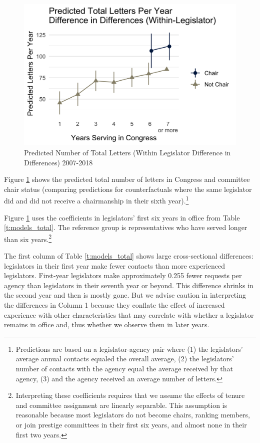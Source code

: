 \begin{figure}[hbt!]
\centering
\caption{Predicted Number of Total Letters (Within Legislator Difference in Differences) 2007-2018} \label{f:m-total-predicted-time}
\includegraphics[width = .8\textwidth]{figs/m-total-predicted-4}
\end{figure}

Figure \ref{f:m-total-predicted-time} shows the predicted total number of letters in Congress and committee chair status (comparing predictions for counterfactuals where the same legislator did and did not receive a chairmanship in their sixth year).\footnote{Predictions are based on a legislator-agency pair where (1) the legislators' average annual contacts equaled the overall average, (2) the legislators' number of contacts with the agency equal the average received by that agency, (3) and the agency received an average number of letters.} 


Figure \ref{f:m-total-predicted-time} uses the coefficients in legislators' first six years in office from Table \ref{t:models_total}. The reference group is representatives who have served longer than six years.\footnote{Interpreting these coefficients requires that we assume the effects of tenure and committee assignment are linearly separable. This assumption is reasonable because most legislators do not become chairs, ranking members, or join prestige committees in their first six years, and almost none in their first two years.} 

The first column of Table \ref{t:models_total} shows large cross-sectional differences: legislators in their first year make fewer contacts than more experienced legislators. First-year legislators make approximately 0.255 fewer requests per agency than legislators in their seventh year or beyond. This difference shrinks in the second year and then is mostly gone. But we advise caution in interpreting the differences in Column 1 because they conflate the effect of increased experience with other characteristics that may correlate with whether a legislator remains in office and, thus whether we observe them in later years.   

